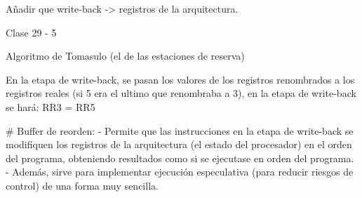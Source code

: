 % 
% 
% 
% 
% 

Añadir que write-back -> registros de la arquitectura.

Clase 29 - 5

Algoritmo de Tomasulo (el de las estaciones de reserva)

En la etapa de write-back, se pasan los valores de los registros renombrados a los registros reales (si 5 era el ultimo que renombraba a 3), en la etapa de write-back se hará:
RR3 = RR5

# Buffer de reorden:
- Permite que las instrucciones en la etapa de write-back se modifiquen los registros de la arquitectura (el estado del procesador) en el orden del programa, obteniendo resultados como si se ejecutase en orden del programa.
- Además, sirve para implementar ejecución especulativa (para reducir riesgos de control) de una forma muy sencilla.

